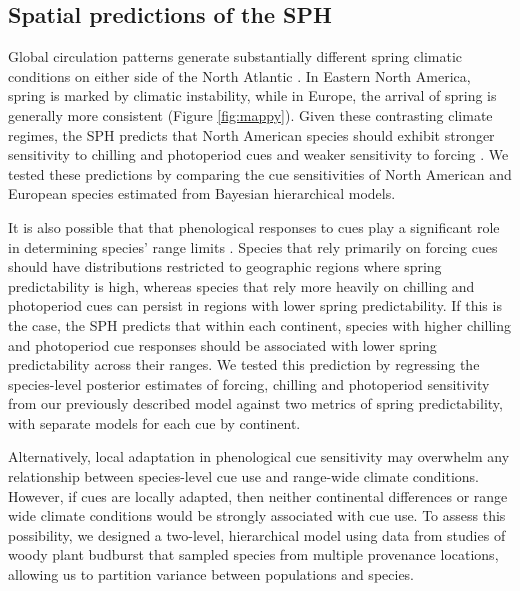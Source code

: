 \documentclass[12pt]{article}
\begin{document}
\subsection*{Spatial predictions of the SPH}
Global circulation patterns generate substantially different spring climatic conditions on either side of the North Atlantic \citep{}. In Eastern North America, spring is marked by climatic instability, while in Europe, the arrival of spring is generally more consistent (Figure \ref{fig:mappy}). Given these contrasting climate regimes, the SPH predicts that North American species should exhibit stronger sensitivity to chilling and photoperiod cues and weaker sensitivity to forcing \citep{Dawson2025}. We tested these predictions by comparing the cue sensitivities of North American and European species estimated from Bayesian hierarchical models. 

It is also possible that that phenological responses to cues play a significant role in determining species' range limits \citep{Chuine2010}. Species that rely primarily on forcing cues should have distributions restricted to geographic regions where spring predictability is high, whereas species that rely more heavily on chilling and photoperiod cues can persist in regions with lower spring predictability. If this is the case, the SPH predicts that within each continent, species with higher chilling and photoperiod cue responses should be associated with lower spring predictability across their ranges. %
We tested this prediction by regressing the species-level posterior estimates of forcing, chilling and photoperiod sensitivity from our previously described model against two metrics of spring predictability, %
with separate models for each cue by continent.

Alternatively, local adaptation in phenological cue sensitivity may overwhelm any relationship between species-level cue use and range-wide climate conditions. However, if cues are locally adapted, then neither continental differences or range wide climate conditions would be strongly associated with cue use. To assess this possibility, we designed a two-level, hierarchical model using data from studies of woody plant budburst that sampled species from multiple provenance locations, allowing us to partition variance between populations and species. %
\end{document}
